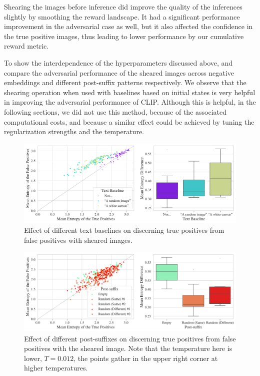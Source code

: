Shearing the images before inference did improve the quality of the inferences slightly by smoothing the reward landscape.
It had a significant performance improvement in the adversarial case as well, but it also affected the confidence in the true positive images, thus leading to lower performance by our cumulative reward metric.

To show the interdependence of the hyperparameters discussed above,  and   compare the adversarial performance of the sheared images across negative embeddings and different post-suffix patterns respectively.
We observe that the shearing operation when used with baselines based on initial states is very helpful in improving the adversarial performance of CLIP.
Although this is helpful, in the following sections, we did not use this method, because of the associated computational costs, and because a similar effect could be achieved by tuning the regularization strengths and the temperature.

\begin{figure}[H]
    \centering
    \includegraphics[width=\textwidth]{images/baseline_sheared_adversarial_2.pdf}
    \caption{Effect of different text baselines on discerning true positives from false positives with sheared images.}
    \label{fig:baseline_sheared_adversarial}
\end{figure}

\begin{figure}[H]
    \centering
    \includegraphics[width=\textwidth]{images/post-suffix_sheared_adversarial_12.pdf}
    \caption[Effect of different post-suffixes on discerning true positives from false positives with sheared images.]{Effect of different post-suffixes on discerning true positives from false positives with the sheared image. Note that the temperature here is lower, \(T = 0.012\), the points gather in the upper right corner at higher temperatures.}
    \label{fig:post-suffix_sheared_adversarial}
\end{figure}


